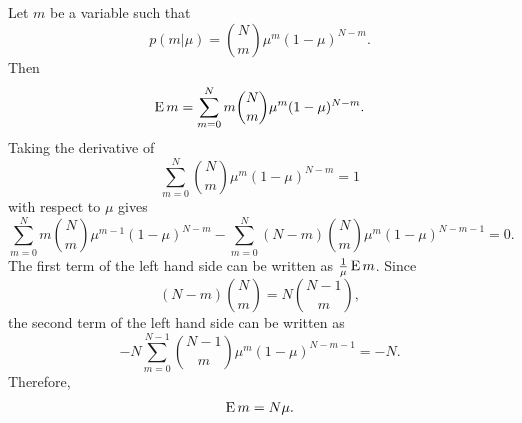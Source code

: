 \subsection{}
\label{2.4}
Let $m$ be a variable such that
%
\begin{equation}
p(m | \mu) 
= 
{N \choose m} 
\mu ^ m 
(1 - \mu) ^ {N - m}.
\end{equation}
%
Then
%
\begin{equation}
\operatorname{E} m 
= 
\sum_{m = 0}^{N} 
m 
{N \choose m} 
\mu ^ m 
(1 - \mu) ^ {N - m}.
\end{equation}
%
Taking  the derivative of 
%
\begin{equation}
\sum_{m = 0}^{N} 
{N \choose m} 
\mu ^ m 
(1 - \mu) ^ {N - m}  
= 
1
\end{equation}
%
with respect to $\mu$ gives
%
\begin{equation}
\sum_{m = 0}^{N} 
m 
{N \choose m} 
\mu ^ {m - 1} 
(1 - \mu) ^ {N - m} 
- 
\sum_{m = 0}^{N} 
(N - m) 
{N \choose m} 
\mu ^ m 
(1 - \mu) ^ {N - m - 1} 
= 
0.
\end{equation}
%
The first term of the left hand side can be written as $\frac{1}{\mu} \operatorname{E} m$.
Since
%
\begin{equation}
(N - m) 
{N \choose m} 
= 
N 
{N - 1 \choose m},
\end{equation}
%
the second term of the left hand side can be written as
%
\begin{equation}
- 
N 
\sum_{m = 0}^{N - 1} 
{N - 1 \choose m} 
\mu ^ m 
(1 - \mu) ^ {N - m - 1} 
= 
- 
N.
\end{equation}
%
Therefore,
%
\begin{equation}
\operatorname{E} m 
= 
N 
\mu. 
\end{equation}
%

